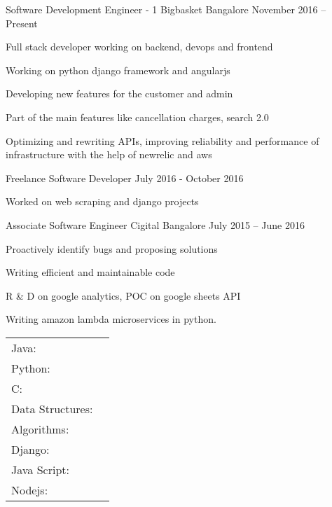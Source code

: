 \documentclass[]{awesome-cv}
\begin{document}
\vspace{-3mm}
\begin{cventries}
	\cventry
	{Software Development Engineer - 1}
	{Bigbasket}
	{Bangalore}
	{November 2016 – Present}
	{\begin{cvitems}
		\item {Full stack developer working on backend, devops and frontend}
		\item {Working on python django framework and angularjs}
		\item {Developing new features for the customer and admin}
		\item {Part of the main features like cancellation charges, search 2.0}
		\item {Optimizing and rewriting APIs, improving reliability and performance of infrastructure with the help of newrelic and aws}
		\end{cvitems}}
	\cventry
	{Freelance Software Developer}
	{}
	{}
	{July 2016 - October 2016}
	{\begin{cvitems}
		\item {Worked on web scraping and django projects}
	\end{cvitems}}
	\cventry
	{Associate Software Engineer}
	{Cigital}
	{Bangalore}
	{July 2015 – June 2016}
	{\begin{cvitems}
		\item {Proactively identify bugs and proposing solutions}
		\item {Writing efficient and maintainable code}
		\item {R \& D on google analytics, POC on google sheets API}
		\item {Writing amazon lambda microservices in python.}
		\end{cvitems}}
\end{cventries}
\vspace{-5mm}
\begin{cventries}
	\cventry
	{}
	{\def\arraystretch{1.15}{\begin{tabular}{ l l }
		Java:  & {\skill{ My favourite programming language}} \\
		Python:  & {\skill{ From where I started learning programming}} \\
		C:  & {\skill{ My first statically typed programming language}} \\
		Data Structures:  & {\skill{ My first love}} \\
		Algorithms:  & {\skill{ With whom I spent most of my time}} \\
		Django:  & {\skill{ My first back-end framework}} \\
		Java Script:  & {\skill{ My first front-end scripting language}} \\
		Nodejs: & {\skill{ Currently learning and exploring in depth}} \\
		\end{tabular}}}
	{}
	{}
	{}
\end{cventries}
\end{document}
